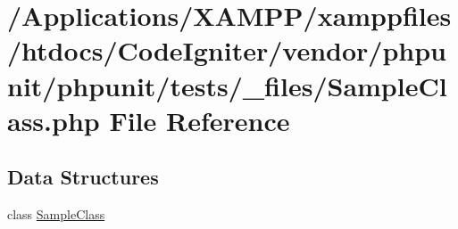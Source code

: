 \hypertarget{phpunit_2phpunit_2tests_2__files_2_sample_class_8php}{}\section{/\+Applications/\+X\+A\+M\+P\+P/xamppfiles/htdocs/\+Code\+Igniter/vendor/phpunit/phpunit/tests/\+\_\+files/\+Sample\+Class.php File Reference}
\label{phpunit_2phpunit_2tests_2__files_2_sample_class_8php}
\subsection*{Data Structures}
\begin{DoxyCompactItemize}
\item 
class \mbox{\hyperlink{class_sample_class}{Sample\+Class}}
\end{DoxyCompactItemize}
